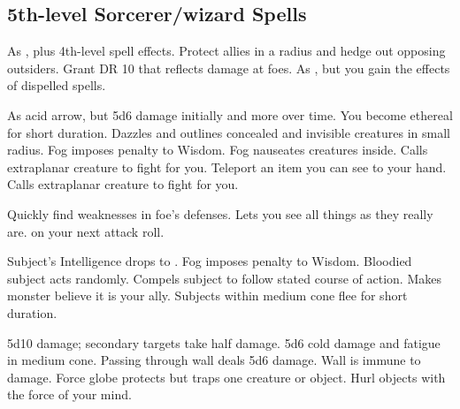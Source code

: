 \subsection{5th-level Sorcerer/wizard Spells} 
\begin{swspelllist}
   As , plus 4th-level spell effects.
   Protect allies in a \areamed radius and hedge out opposing outsiders.
   Grant DR 10 that reflects damage at foes.
   As , but you gain the effects of dispelled spells.
  \spellheadrestricted{}

   As acid arrow, but 5d6 damage initially and more over time.
   You become ethereal for short duration.
   Dazzles and outlines concealed and invisible creatures in small radius.
   Fog imposes  penalty to Wisdom.
   Fog nauseates creatures inside.
   Calls extraplanar creature to fight for you.
   Teleport an item you can see to your hand.
   Calls extraplanar creature to fight for you.

   Quickly find weaknesses in foe's defenses.
  \M Lets you see all things as they really are.
    on your next attack roll.

   Subject's Intelligence drops to .
   Fog imposes  penalty to Wisdom.
   Bloodied subject acts randomly.
   Compels subject to follow stated course of action.
   Makes monster believe it is your ally.
   Subjects within medium cone flee for short duration.

   5d10 damage; secondary targets take half damage.
   5d6 cold damage and fatigue in medium cone.
   Passing through wall deals 5d6 damage.
   Wall is immune to damage.
   Force globe protects but traps one creature or object.
   Hurl objects with the force of your mind.


\end{swspelllist}
